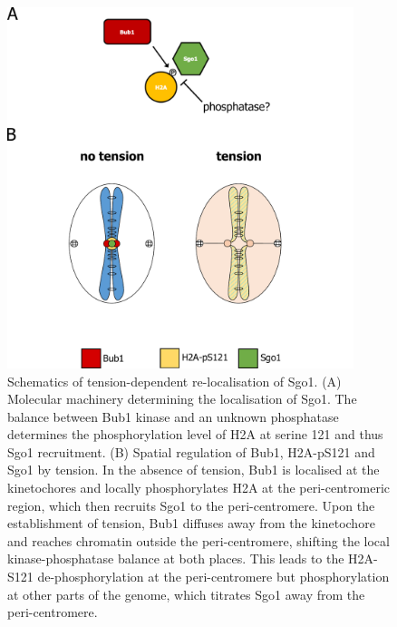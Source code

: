 \begin{figure}[htbp]
  \centering
  \includegraphics[width=0.9\textwidth]{chapter3/figures/graphic_model_final.pdf}
  \caption[Schematics of tension-dependent re-localisation of Sgo1]{Schematics of tension-dependent re-localisation of Sgo1. (A) Molecular machinery determining the localisation of Sgo1. The balance between Bub1 kinase and an unknown phosphatase determines the phosphorylation level of H2A at serine 121 and thus Sgo1 recruitment. (B) Spatial regulation of Bub1, H2A-pS121 and Sgo1 by tension. In the absence of tension, Bub1 is localised at the kinetochores and locally phosphorylates H2A at the peri-centromeric region, which then recruits Sgo1 to the peri-centromere. Upon the establishment of tension, Bub1 diffuses away from the kinetochore and reaches chromatin outside the peri-centromere, shifting the local kinase-phosphatase balance at both places. This leads to the H2A-S121 de-phosphorylation at the peri-centromere but phosphorylation at other parts of the genome, which titrates Sgo1 away from the peri-centromere.}
  \label{fig:finalmodel}
\end{figure}

